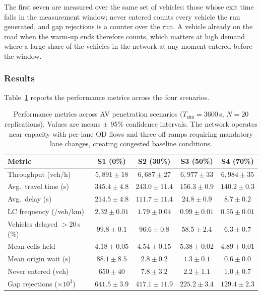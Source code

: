\documentclass[review,authoryear]{elsarticle}
\begin{document}
The first seven are measured over the same set of vehicles: those whose exit time falls in the measurement window; never entered counts every vehicle the run generated, and gap rejections is a counter over the run. A vehicle already on the road when the warm-up ends therefore counts, which matters at high demand where a large share of the vehicles in the network at any moment entered before the window.

\subsubsection{Results}

Table~\ref{tab:results_mixed} reports the performance metrics across the four scenarios.

\begin{table}[ht]
\centering
\caption{Performance metrics across AV penetration scenarios ($T_{\text{sim}} = 3600$\,s, $N = 20$ replications). Values are means $\pm$ 95\% confidence intervals. The network operates near capacity with per-lane OD flows and three off-ramps requiring mandatory lane changes, creating congested baseline conditions.}
\label{tab:results_mixed}
\begin{tabular}{@{}lcccc@{}}
\toprule
Metric & S1 (0\%) & S2 (30\%) & S3 (50\%) & S4 (70\%) \\
\midrule
Throughput (veh/h) & $5{,}891 \pm 18$ & $6{,}687 \pm 27$ & $6{,}977 \pm 33$ & $6{,}984 \pm 35$ \\
Avg.\ travel time (s) & $345.4 \pm 4.8$ & $243.0 \pm 11.4$ & $156.3 \pm 0.9$ & $140.2 \pm 0.3$ \\
Avg.\ delay (s) & $214.5 \pm 4.8$ & $111.7 \pm 11.4$ & $24.8 \pm 0.9$ & $8.7 \pm 0.2$ \\
LC frequency (/veh/km) & $2.32 \pm 0.01$ & $1.79 \pm 0.04$ & $0.99 \pm 0.01$ & $0.55 \pm 0.01$ \\
Vehicles delayed $>20$\,s (\%) & $99.8 \pm 0.1$ & $96.6 \pm 0.8$ & $58.5 \pm 2.4$ & $6.3 \pm 0.7$ \\
Mean cells held & $4.18 \pm 0.05$ & $4.54 \pm 0.15$ & $5.38 \pm 0.02$ & $4.89 \pm 0.01$ \\
Mean origin wait (s) & $88.1 \pm 8.5$ & $2.8 \pm 0.2$ & $1.3 \pm 0.1$ & $0.6 \pm 0.0$ \\
Never entered (veh) & $650 \pm 40$ & $7.8 \pm 3.2$ & $2.2 \pm 1.1$ & $1.0 \pm 0.7$ \\
Gap rejections ($\times 10^3$) & $641.5 \pm 3.9$ & $417.1 \pm 11.9$ & $225.2 \pm 3.4$ & $129.4 \pm 2.3$ \\
\bottomrule
\end{tabular}
\end{table}
\end{document}
